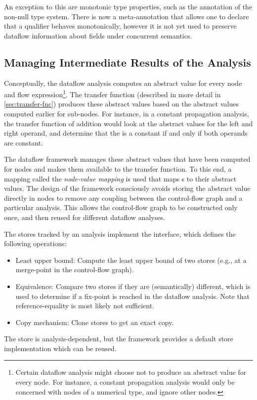 An exception to this are monotonic type properties, such as the  annotation
of the non-null type system.  There is now a meta-annotation  that
allows one to declare that a qualifier behaves monotonically, however it is not yet used to
preserve dataflow information about fields under concurrent semantics.


\subsection{Managing Intermediate Results of the Analysis}
\label{sec:node-mapping}
\label{sec:store-management}

Conceptually, the dataflow analysis computes an abstract value for every node and flow expression\footnote{Certain
dataflow analysis might choose not to produce an abstract value for every node.  For instance,
a constant propagation analysis would only be concerned with nodes of a numerical type, and
ignore other nodes.}.
The transfer function (described in more detail in \autoref{sec:transfer-fnc}) produces these abstract
values based on the abstract values computed earlier for sub-nodes.
For instance, in a constant propagation analysis, the transfer function of addition would look at
the abstract values for the left and right operand, and determine that the 
is a constant if and only if both operands are constant.

The dataflow framework manages these abstract values that have been computed for nodes and
makes them available to the transfer function.  To this end, a mapping called the
\emph{node-value mapping} is used that maps s to their abstract values.
The design of the framework consciously avoids storing the abstract value directly in
nodes to remove any coupling between the control-flow graph and a particular analysis.
This allows the control-flow graph to be constructed only once, and then reused for different
dataflow analyses.

The stores tracked by an analysis implement the  interface, which defines the
following operations:
\begin{itemize}
\item Least upper bound: Compute the least upper bound of two stores (e.g., at a merge-point
in the control-flow graph).
\item Equivalence: Compare two stores if they are (semantically) different, which is used
to determine if a fix-point is reached in the dataflow analysis. Note that reference-equality
is most likely not sufficient.
\item Copy mechanism: Clone stores to get an exact copy.
\end{itemize}
The store is analysis-dependent, but the framework provides a default store implementation
which can be reused.

